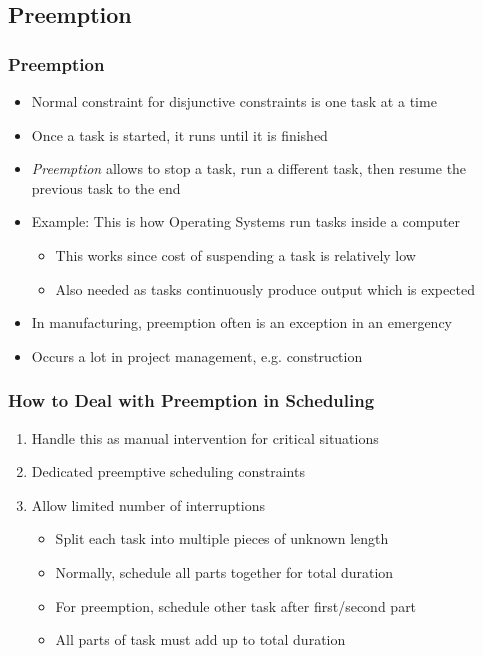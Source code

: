 \subsection{Preemption}

\begin{frame}
\frametitle{Preemption \navail}
\begin{itemize}
\item Normal constraint for disjunctive constraints is one task at a time
\item Once a task is started, it runs until it is finished
\item \emph{Preemption} allows to stop a task, run a different task, then resume the previous task to the end
\item Example: This is how Operating Systems run tasks inside a computer
\begin{itemize}
\item This works since cost of suspending a task is relatively low
\item Also needed as tasks continuously produce output which is expected
\end{itemize}
\item In manufacturing, preemption often is an exception in an emergency
\item Occurs a lot in project management, e.g. construction
\end{itemize}
\end{frame}

\begin{frame}
\frametitle{How to Deal with Preemption in Scheduling}
\begin{enumerate}
\item Handle this as manual intervention for critical situations
\item Dedicated preemptive scheduling constraints
\item Allow limited number of interruptions
\begin{itemize}
\item Split each task into multiple pieces of unknown length
\item Normally, schedule all parts together for total duration
\item For preemption, schedule other task after first/second part
\item All parts of task must add up to total duration 
\end{itemize}
\end{enumerate}
\end{frame}



